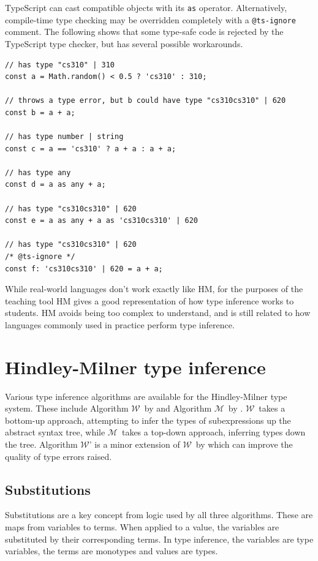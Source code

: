 \documentclass[a4paper,fleqn,oneside,12pt]{report}
\newcommand{\W}{$\mathcal{W}$}
\newcommand{\M}{$\mathcal{M}$}
\begin{document}
TypeScript can cast compatible objects with its \texttt{as} operator. Alternatively, compile-time type checking may be overridden completely with a \texttt{@ts-ignore} comment. The following shows that some type-safe code is rejected by the TypeScript type checker, but has several possible workarounds.

\begin{verbatim}
// has type "cs310" | 310
const a = Math.random() < 0.5 ? 'cs310' : 310;

// throws a type error, but b could have type "cs310cs310" | 620
const b = a + a;

// has type number | string
const c = a == 'cs310' ? a + a : a + a;

// has type any
const d = a as any + a;

// has type "cs310cs310" | 620
const e = a as any + a as 'cs310cs310' | 620

// has type "cs310cs310" | 620
/* @ts-ignore */
const f: 'cs310cs310' | 620 = a + a;
\end{verbatim}

While real-world languages don't work exactly like HM, for the purposes of the teaching tool HM gives a good representation of how type inference works to students. HM avoids being too complex to understand, and is still related to how languages commonly used in practice perform type inference.

\section{Hindley-Milner type inference}\label{id:h.admfqf7bhkct}

Various type inference algorithms are available for the Hindley-Milner type system. These include Algorithm \W\ by \cite{ref13} and Algorithm \M\ by \cite{ref27}. \W\ takes a bottom-up approach, attempting to infer the types of subexpressions up the abstract syntax tree, while \M\ takes a top-down approach, inferring types down the tree. Algorithm \W' is a minor extension of \W\ by \cite{ref28} which can improve the quality of type errors raised.

\subsection{Substitutions}

Substitutions are a key concept from logic used by all three algorithms. These are maps from variables to terms. When applied to a value, the variables are substituted by their corresponding terms. In type inference, the variables are type variables, the terms are monotypes and values are types.
\end{document}
